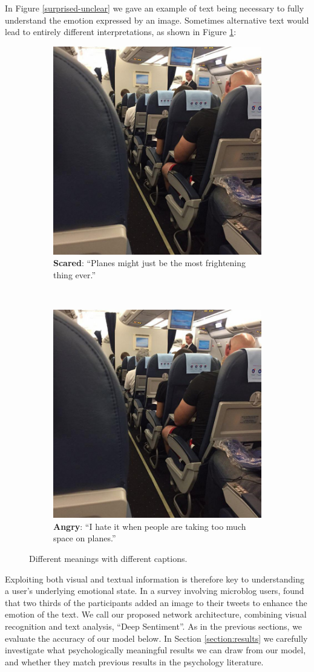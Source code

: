 \documentclass{article} %
\begin{document}
In Figure \ref{surprised-unclear} we gave an example of text being necessary to fully understand the emotion expressed by an image. Sometimes alternative text would lead to entirely different interpretations, as shown in Figure \ref{ambiguous}:

\begin{figure}[H]
    \begin{subfigure}{.48\textwidth}
        \centering
        \includegraphics[width=0.5\linewidth]{Images/scared.jpg}
        \caption{\textbf{Scared}: ``Planes might just be the most frightening thing ever.'' }
    \end{subfigure}~~
    \begin{subfigure}{.48\textwidth}
        \centering
        \includegraphics[width=0.5\linewidth]{Images/scared.jpg}
        \caption{\textbf{Angry}: ``I hate it when people are taking too much space on planes.''}
    \end{subfigure}
    \caption{Different meanings with different captions.}
    \label{ambiguous}
\end{figure}

Exploiting both visual and textual information is therefore key to understanding a user's underlying emotional state. In a survey involving microblog users, \citet{Taochen-17} found that two thirds of the participants added an image to their tweets to enhance the emotion of the text.
We call our proposed network architecture, combining visual recognition and text analysis, ``Deep Sentiment''. As in the previous sections, we evaluate the accuracy of our model below. In Section \ref{section:results} we carefully investigate what psychologically meaningful results we can draw from our model, and whether they match previous results in the psychology literature.
\end{document}
